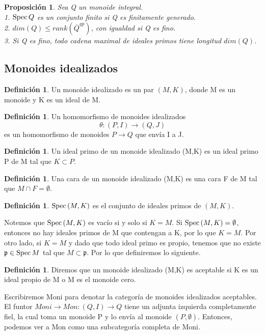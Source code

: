 \documentclass[12pt,spanish]{amsart}
\newcommand{\fk}[1]{\mathfrak{#1}}
\def\Spec{\mathop{\mbox{\normalfont Spec}}\nolimits}
\newtheorem{prop}[Theorem]{Proposición}
\theoremstyle{definition}
\newtheorem{Def}[Theorem]{Definición}
\theoremstyle{remark}
\begin{document}
\begin{prop}
Sea Q un monoide \textit{integral}. \\
1. $\Spec{Q}$ es un conjunto finito si Q es finitamente generado. \\
2. $dim(Q)\leq rank(\overline{Q}^{gp})$, con igualdad si Q es fino. \\ 
3. Si Q es fino, todo cadena maximal de ideales primos tiene longitud $dim(Q)$.     
\end{prop}




\subsection{Monoides idealizados}
\begin{Def}
Un monoide idealizado es un par $(M,K)$, donde M es un monoide y K es un ideal de M. 
\end{Def}

\begin{Def}
Un homomorfismo de monoides idealizados 
$$\theta:(P,I) \to (Q,J)$$
es un homomorfismo de monoides $P \to Q$ que envía I a J. 
\end{Def}

\begin{Def}
Un ideal primo de un monoide idealizado (M,K) es un ideal primo P de M tal que $K \subset P$.
\end{Def}

\begin{Def}
Una cara de un monoide idealizado (M,K) es una cara F de M  tal que $M \cap F= \emptyset$.    
\end{Def}

\begin{Def}
$\Spec{(M,K)}$ es el conjunto de ideales primos de $(M,K)$.
\end{Def}

Notemos que $\Spec{(M,K)}$ es vacío si y solo si $K=M$. Si $\Spec{(M,K)}=\emptyset$, entonces no hay ideales primos de M que contengan a K, por lo que $K=M$. Por otro lado, si $K=M$ y dado que todo ideal primo es propio, tenemos que no existe $\fk{p}\in \Spec{M}$ tal que $M\subset \fk{p}$. Por lo que definiremos lo siguiente.

\begin{Def}
Diremos que un monoide idealizado (M,K) es aceptable si K es un ideal propio de M o M es el monoide cero.  
\end{Def}

Escribiremos Moni para denotar la categoría de monoides idealizados aceptables. El funtor $Moni \to Mon: (Q,I) \to Q$ tiene un adjunta izquierda completamente fiel, la cual toma un monoide P y lo envía al monoide $(P,\emptyset)$. Entonces, podemos ver a Mon como una subcategoría completa de Moni.     
\end{document}
